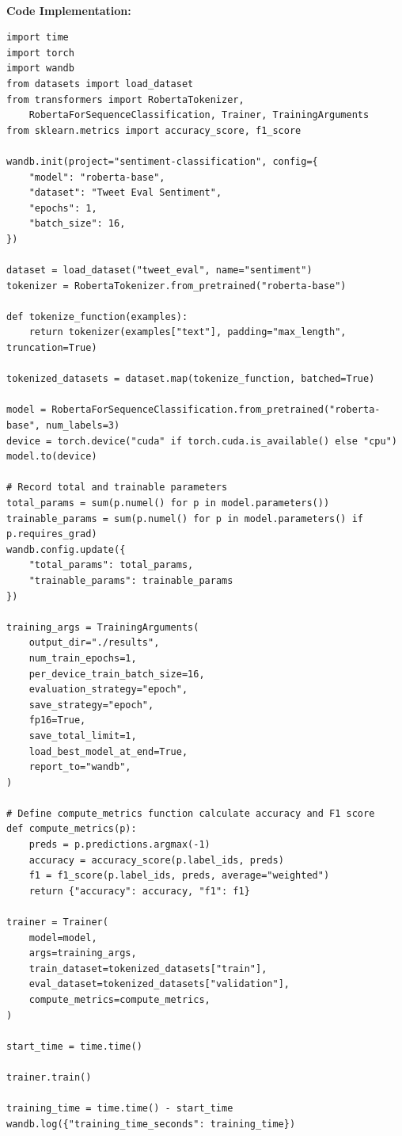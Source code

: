 \documentclass[11pt, oneside]{article}   	%
\begin{document}
\\
\textbf{Code Implementation: }
\begin{verbatim}
import time
import torch
import wandb
from datasets import load_dataset
from transformers import RobertaTokenizer, 
    RobertaForSequenceClassification, Trainer, TrainingArguments
from sklearn.metrics import accuracy_score, f1_score

wandb.init(project="sentiment-classification", config={
    "model": "roberta-base",
    "dataset": "Tweet Eval Sentiment",
    "epochs": 1,
    "batch_size": 16,
})

dataset = load_dataset("tweet_eval", name="sentiment")
tokenizer = RobertaTokenizer.from_pretrained("roberta-base")

def tokenize_function(examples):
    return tokenizer(examples["text"], padding="max_length", truncation=True)

tokenized_datasets = dataset.map(tokenize_function, batched=True)

model = RobertaForSequenceClassification.from_pretrained("roberta-base", num_labels=3)
device = torch.device("cuda" if torch.cuda.is_available() else "cpu")
model.to(device)

# Record total and trainable parameters
total_params = sum(p.numel() for p in model.parameters())
trainable_params = sum(p.numel() for p in model.parameters() if p.requires_grad)
wandb.config.update({
    "total_params": total_params,
    "trainable_params": trainable_params
})

training_args = TrainingArguments(
    output_dir="./results",
    num_train_epochs=1,
    per_device_train_batch_size=16,
    evaluation_strategy="epoch",
    save_strategy="epoch",
    fp16=True, 
    save_total_limit=1,
    load_best_model_at_end=True,
    report_to="wandb",
)

# Define compute_metrics function calculate accuracy and F1 score
def compute_metrics(p):
    preds = p.predictions.argmax(-1)
    accuracy = accuracy_score(p.label_ids, preds)
    f1 = f1_score(p.label_ids, preds, average="weighted")
    return {"accuracy": accuracy, "f1": f1}

trainer = Trainer(
    model=model,
    args=training_args,
    train_dataset=tokenized_datasets["train"],
    eval_dataset=tokenized_datasets["validation"],
    compute_metrics=compute_metrics,
)

start_time = time.time()

trainer.train()

training_time = time.time() - start_time
wandb.log({"training_time_seconds": training_time})


\end{verbatim}
\end{document}
